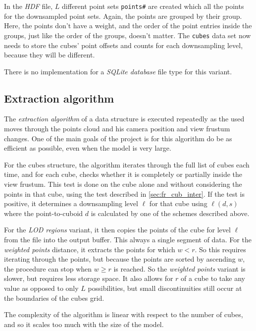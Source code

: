 \documentclass[a4paper,10pt,abstracton,notitlepage]{scrreprt}
\begin{document}
In the \emph{HDF} file, $L$ different point sets \texttt{points\#} are created which all the points for the downsampled point sets. Again, the points are grouped by their group. Here, the points don't have a weight, and the order of the point entries inside the groups, just like the order of the groups, doesn't matter. The \texttt{cubes} data set now needs to store the cubes' point offsets and counts for each downsampling level, because they will be different.

There is no implementation for a \emph{SQLite database} file type for this variant.


\subsection{Extraction algorithm}
The \emph{extraction algorithm} of a data structure is executed repeatedly as the used moves through the points cloud and his camera position and view frustum changes. One of the main goals of the project is for this algorithm do be as efficient as possible, even when the model is very large.

For the cubes structure, the algorithm iterates through the full list of cubes each time, and for each cube, checks whether it is completely or partially inside the view frustum. This test is done on the cube alone and without considering the points in that cube, using the test described in \ref{sec:fr_cub_inter}. If the test is positive, it determines a downsampling level $\ell$ for that cube using $\ell(d, s)$ where the point-to-cuboid $d$ is calculated by one of the schemes described above.

For the \emph{LOD regions} variant, it then copies the points of the cube for level $\ell$ from the file into the output buffer. This always a single segment of data. For the \emph{weighted points} distance, it extracts the points for which $w < r$. So this requires iterating through the points, but because the points are sorted by ascending $w$, the procedure can stop when $w \geq r$ is reached. So the \emph{weighted points} variant is slower, but requires less storage space. It also allows for $r$ of a cube to take any value as opposed to only $L$ possibilities, but small discontinuities still occur at the boundaries of the cubes grid.

The complexity of the algorithm is linear with respect to the number of cubes, and so it scales too much with the size of the model.

\pagebreak
\end{document}
